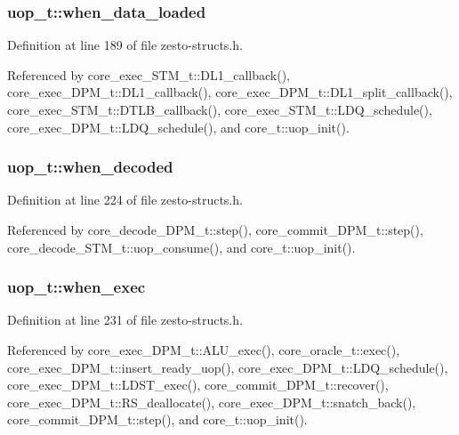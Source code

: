 \subsubsection[{when\_\-data\_\-loaded}]{ {\bf uop\_\-t::when\_\-data\_\-loaded}}\label{structuop__t_a54efc9d4d0253ebecdac3485cdd5d93}




Definition at line 189 of file zesto-structs.h.

Referenced by core\_\-exec\_\-STM\_\-t::DL1\_\-callback(), core\_\-exec\_\-DPM\_\-t::DL1\_\-callback(), core\_\-exec\_\-DPM\_\-t::DL1\_\-split\_\-callback(), core\_\-exec\_\-STM\_\-t::DTLB\_\-callback(), core\_\-exec\_\-STM\_\-t::LDQ\_\-schedule(), core\_\-exec\_\-DPM\_\-t::LDQ\_\-schedule(), and core\_\-t::uop\_\-init().
\subsubsection[{when\_\-decoded}]{ {\bf uop\_\-t::when\_\-decoded}}\label{structuop__t_67254717405ebd49e51d3e8633823a4c}




Definition at line 224 of file zesto-structs.h.

Referenced by core\_\-decode\_\-DPM\_\-t::step(), core\_\-commit\_\-DPM\_\-t::step(), core\_\-decode\_\-STM\_\-t::uop\_\-consume(), and core\_\-t::uop\_\-init().
\subsubsection[{when\_\-exec}]{ {\bf uop\_\-t::when\_\-exec}}\label{structuop__t_6a823830b3496618e63ce4486f60fe8c}




Definition at line 231 of file zesto-structs.h.

Referenced by core\_\-exec\_\-DPM\_\-t::ALU\_\-exec(), core\_\-oracle\_\-t::exec(), core\_\-exec\_\-DPM\_\-t::insert\_\-ready\_\-uop(), core\_\-exec\_\-DPM\_\-t::LDQ\_\-schedule(), core\_\-exec\_\-DPM\_\-t::LDST\_\-exec(), core\_\-commit\_\-DPM\_\-t::recover(), core\_\-exec\_\-DPM\_\-t::RS\_\-deallocate(), core\_\-exec\_\-DPM\_\-t::snatch\_\-back(), core\_\-commit\_\-DPM\_\-t::step(), and core\_\-t::uop\_\-init().
